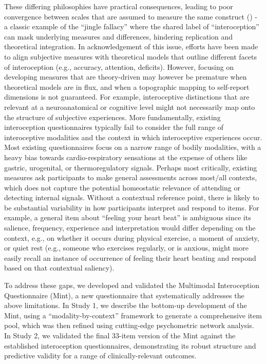 \documentclass[
  jou,
  floatsintext,
  longtable,
  nolmodern,
  notxfonts,
  notimes,
  colorlinks=true,linkcolor=blue,citecolor=blue,urlcolor=blue]{apa7}
\begin{document}
These differing philosophies have practical consequences, leading to
poor convergence between scales that are assumed to measure the same
construct () - a
classic example of the ``jingle fallacy'' where the shared label of
``interoception'' can mask underlying measures and differences,
hindering replication and theoretical integration. In acknowledgement of
this issue, efforts have been made to align subjective measures with
theoretical models that outline different facets of interoception (e.g.,
accuracy, attention, deficits). However, focusing on developing measures
that are theory-driven may however be premature when theoretical models
are in flux, and when a topographic mapping to self-report dimensions is
not guaranteed. For example, interoceptive distinctions that are
relevant at a neuroanatomical or cognitive level might not necessarily
map onto the structure of subjective experiences. More fundamentally,
existing interoception questionnaires typically fail to consider the
full range of interoceptive modalities and the context in which
interoceptive experiences occur. Most existing questionnaires focus on a
narrow range of bodily modalities, with a heavy bias towards
cardio-respiratory sensations at the expense of others like gastric,
urogenital, or thermoregulatory signals. Perhaps most critically,
existing measures ask participants to make general assessments across
most/all contexts, which does not capture the potential homeostatic
relevance of attending or detecting internal signals. Without a
contextual reference point, there is likely to be substantial
variability in how participants interpret and respond to items. For
example, a general item about ``feeling your heart beat'' is ambiguous
since its salience, frequency, experience and interpretation would
differ depending on the context, e.g., on whether it occurs during
physical exercise, a moment of anxiety, or quiet rest (e.g., someone who
exercises regularly, or is anxious, might more easily recall an instance
of occurrence of feeling their heart beating and respond based on that
contextual saliency).

To address these gaps, we developed and validated the Multimodal
Interoception Questionnaire (Mint), a new questionnaire that
systematically addresses the above limitations. In Study 1, we describe
the bottom-up development of the Mint, using a ``modality-by-context''
framework to generate a comprehensive item pool, which was then refined
using cutting-edge psychometric network analysis. In Study 2, we
validated the final 33-item version of the Mint against the established
interoception questionnaires, demonstrating its robust structure and
predictive validity for a range of clinically-relevant outcomes.
\end{document}
